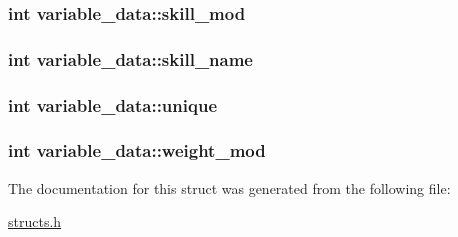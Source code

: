 \hypertarget{structvariable__data_a508e4c50dfc2879ad76d1873516abc4b}{
\subsubsection[{skill\-\_\-mod}]{\setlength{\rightskip}{0pt plus 5cm}int variable\-\_\-data\-::skill\-\_\-mod}}\label{structvariable__data_a508e4c50dfc2879ad76d1873516abc4b}
\hypertarget{structvariable__data_af163ab07c1d83fbe7d89d967652424c2}{
\subsubsection[{skill\-\_\-name}]{\setlength{\rightskip}{0pt plus 5cm}int variable\-\_\-data\-::skill\-\_\-name}}\label{structvariable__data_af163ab07c1d83fbe7d89d967652424c2}
\hypertarget{structvariable__data_af1e6b936a79f29767c0b62cbbacf9edd}{
\subsubsection[{unique}]{\setlength{\rightskip}{0pt plus 5cm}int variable\-\_\-data\-::unique}}\label{structvariable__data_af1e6b936a79f29767c0b62cbbacf9edd}
\hypertarget{structvariable__data_ad0f0fa6e7ac8209718c821e5473cc7b9}{
\subsubsection[{weight\-\_\-mod}]{\setlength{\rightskip}{0pt plus 5cm}int variable\-\_\-data\-::weight\-\_\-mod}}\label{structvariable__data_ad0f0fa6e7ac8209718c821e5473cc7b9}


The documentation for this struct was generated from the following file\-:\begin{DoxyCompactItemize}
\item 
\hyperlink{structs_8h}{structs.\-h}\end{DoxyCompactItemize}
